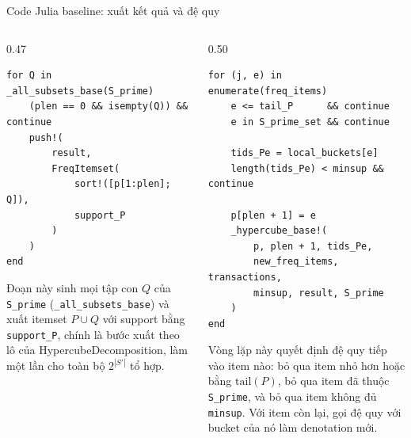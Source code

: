 \documentclass[9pt, aspectratio=169]{beamer}
\begin{document}
\begin{frame}[fragile]{Code Julia baseline: xuất kết quả và đệ quy}
  \begin{columns}[T,onlytextwidth]
    \begin{column}{0.47\textwidth}
\begin{lstlisting}
for Q in _all_subsets_base(S_prime)
    (plen == 0 && isempty(Q)) && continue
    push!(
        result,
        FreqItemset(
            sort!([p[1:plen]; Q]),
            support_P
        )
    )
end
\end{lstlisting}
      \small Đoạn này sinh mọi tập con $Q$ của \texttt{S\_prime}
      (\texttt{\_all\_subsets\_base}) và xuất itemset $P\cup Q$ với support
      bằng \texttt{support\_P}, chính là bước xuất theo lô của
      HypercubeDecomposition, làm một lần cho toàn bộ $2^{|S'|}$ tổ hợp.
    \end{column}

    \begin{column}{0.50\textwidth}
\begin{lstlisting}
for (j, e) in enumerate(freq_items)
    e <= tail_P      && continue
    e in S_prime_set && continue

    tids_Pe = local_buckets[e]
    length(tids_Pe) < minsup && continue

    p[plen + 1] = e
    _hypercube_base!(
        p, plen + 1, tids_Pe,
        new_freq_items, transactions,
        minsup, result, S_prime
    )
end
\end{lstlisting}
      \small Vòng lặp này quyết định đệ quy tiếp vào item nào: bỏ qua item
      nhỏ hơn hoặc bằng $\mathrm{tail}(P)$, bỏ qua item đã thuộc
      \texttt{S\_prime}, và bỏ qua item không đủ \texttt{minsup}. Với item
      còn lại, gọi đệ quy với bucket của nó làm denotation mới.
    \end{column}
  \end{columns}
\end{frame}
\end{document}
